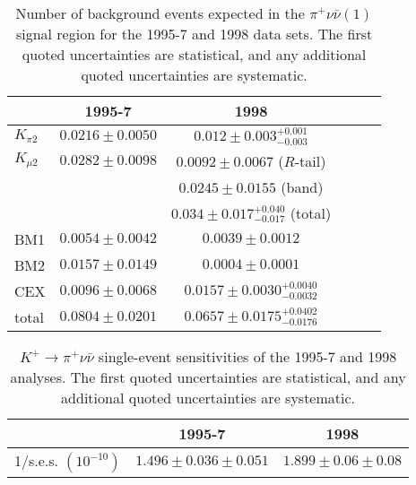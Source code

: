 \documentclass[11pt,twoside]{article}
\def\KPNN{K^+ \rightarrow \pi^+ \nu \bar{\nu}}
\def\PNN{\pi^+ \nu \bar{\nu}}
\def\KMU{K_{\mu 2}}
\def\KPI{K_{\pi 2}}
\begin{document}
\begin{table}[b]
\begin{center}
\begin{tabular}{|l||c|c|c|c|c||}
\hline 
 & 1995-7 & 1998 \\ 
\hline 
\hline 
$\KPI$ & $0.0216 \pm 0.0050$ & $0.012 \pm 0.003 ^{+0.001} _{-0.003}$ \\
\hline 
$\KMU$ & $0.0282 \pm 0.0098$ & $0.0092 \pm 0.0067$ ($R$-tail) \\
       &                     & $0.0245 \pm 0.0155$ (band) \\
       &                     & $0.034 \pm 0.017 ^{+0.040} _{-0.017}$ (total) \\
\hline 
BM1    & $0.0054 \pm 0.0042$ & $0.0039 \pm 0.0012$ \\
\hline 
BM2    & $0.0157 \pm 0.0149$ & $0.0004 \pm 0.0001$ \\
\hline 
CEX    & $0.0096 \pm 0.0068$ & $0.0157 \pm 0.0030 ^{+0.0040} _{-0.0032}$ \\
\hline 
\hline 
total  & $0.0804 \pm 0.0201$ & $0.0657 \pm 0.0175 ^{+0.0402} _{-0.0176}$ \\
\hline
\end{tabular} 
\caption[Number of background events expected in the $\PNN (1)$ signal region.]
{Number of background events expected in the $\PNN (1)$ signal region
for the 1995-7 and 1998 data sets.  The first quoted uncertainties are
statistical, and any additional quoted uncertainties are systematic.
   \label{t:bg} }
\end{center}
\end{table}

\begin{table}[b]
\begin{center}
\begin{tabular}{|l||c|c|}
\hline 
 & 1995-7 & 1998 \\ 
\hline 
1/s.e.s. $(10^{-10})$ &$1.496 \pm 0.036 \pm 0.051$ &$1.899 \pm 0.06 \pm 0.08$ \\
\hline
\end{tabular} 
\caption[$\KPNN$ single-event sensitivities of the 1995-7 and 1998 analyses.]
{$\KPNN$ single-event sensitivities of the 1995-7 and 1998 analyses.
The first quoted uncertainties are
statistical, and any additional quoted uncertainties are systematic.
   \label{t:sens} }
\end{center}
\end{table}
\end{document}
